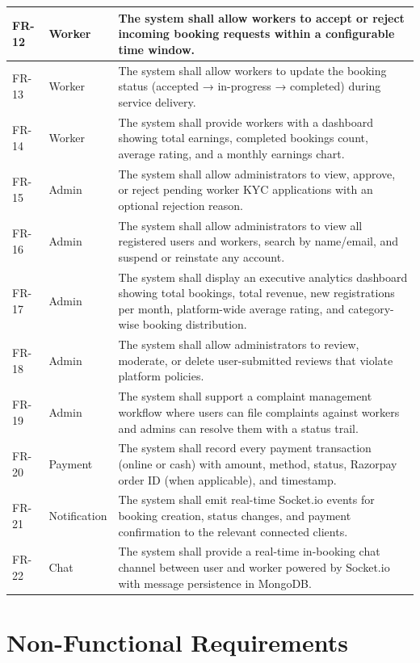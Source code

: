 \documentclass[12pt,a4paper]{report}
\begin{document}
\begin{longtable}{|p{0.8cm}|p{3cm}|p{9.5cm}|}
\hline
FR-12 & Worker & The system shall allow workers to accept or reject incoming booking requests within a configurable time window. \\
\hline
FR-13 & Worker & The system shall allow workers to update the booking status (accepted → in-progress → completed) during service delivery. \\
\hline
FR-14 & Worker & The system shall provide workers with a dashboard showing total earnings, completed bookings count, average rating, and a monthly earnings chart. \\
\hline
FR-15 & Admin & The system shall allow administrators to view, approve, or reject pending worker KYC applications with an optional rejection reason. \\
\hline
FR-16 & Admin & The system shall allow administrators to view all registered users and workers, search by name/email, and suspend or reinstate any account. \\
\hline
FR-17 & Admin & The system shall display an executive analytics dashboard showing total bookings, total revenue, new registrations per month, platform-wide average rating, and category-wise booking distribution. \\
\hline
FR-18 & Admin & The system shall allow administrators to review, moderate, or delete user-submitted reviews that violate platform policies. \\
\hline
FR-19 & Admin & The system shall support a complaint management workflow where users can file complaints against workers and admins can resolve them with a status trail. \\
\hline
FR-20 & Payment & The system shall record every payment transaction (online or cash) with amount, method, status, Razorpay order ID (when applicable), and timestamp. \\
\hline
FR-21 & Notification & The system shall emit real-time Socket.io events for booking creation, status changes, and payment confirmation to the relevant connected clients. \\
\hline
FR-22 & Chat & The system shall provide a real-time in-booking chat channel between user and worker powered by Socket.io with message persistence in MongoDB. \\
\hline
\end{longtable}

\section{Non-Functional Requirements}
\end{document}
